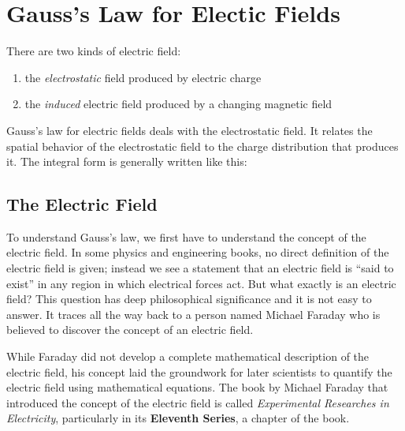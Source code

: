 \section{Gauss's Law for Electic Fields}

There are two kinds of electric field:

\begin{enumerate}
    \item the \textit{electrostatic} field produced by electric charge
    \item the \textit{induced} electric field produced by a changing magnetic field
\end{enumerate}

Gauss's law for electric fields deals with the electrostatic field. It relates the spatial behavior of the electrostatic
field to the charge distribution that produces it. The integral form is generally written like this:

\subsection{The Electric Field}

To understand Gauss's law, we first have to understand the concept of the electric field. In some physics and
engineering books, no direct definition of the electric field is given; instead we see a statement that an electric
field is ``said to exist'' in any region in which electrical forces act. But what exactly is an electric field? This
question has deep philosophical significance and it is not easy to answer. It traces all the way back to a person named
Michael Faraday who is believed to discover the concept of an electric field.

While Faraday did not develop a complete mathematical description of the electric field, his concept laid the groundwork
for later scientists to quantify the electric field using mathematical equations. The book by Michael Faraday that
introduced the concept of the electric field is called \textit{Experimental Researches in Electricity}, particularly in
its \textbf{Eleventh Series}, a chapter of the book.

